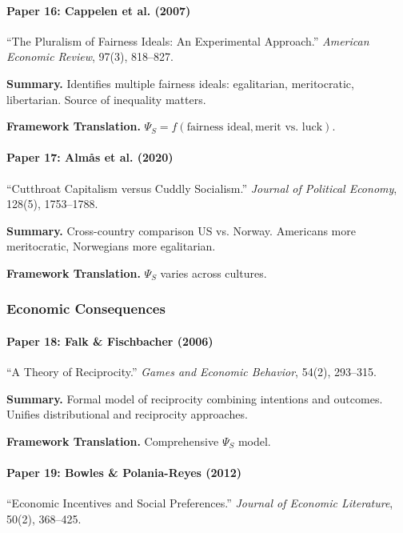 \paragraph{Paper 16: Cappelen et al. (2007)}

``The Pluralism of Fairness Ideals: An Experimental Approach.''
\textit{American Economic Review}, 97(3), 818--827.

\textbf{Summary.}
Identifies multiple fairness ideals: egalitarian, meritocratic, libertarian.
Source of inequality matters.

\textbf{Framework Translation.}
$\Psi_S = f(\text{fairness ideal}, \text{merit vs. luck})$.

\paragraph{Paper 17: Almås et al. (2020)}

``Cutthroat Capitalism versus Cuddly Socialism.''
\textit{Journal of Political Economy}, 128(5), 1753--1788.

\textbf{Summary.}
Cross-country comparison US vs. Norway. Americans more meritocratic, 
Norwegians more egalitarian.

\textbf{Framework Translation.}
$\Psi_S$ varies across cultures.

\subsubsection{Economic Consequences}

\paragraph{Paper 18: Falk \& Fischbacher (2006)}

``A Theory of Reciprocity.''
\textit{Games and Economic Behavior}, 54(2), 293--315.

\textbf{Summary.}
Formal model of reciprocity combining intentions and outcomes.
Unifies distributional and reciprocity approaches.

\textbf{Framework Translation.}
Comprehensive $\Psi_S$ model.

\paragraph{Paper 19: Bowles \& Polania-Reyes (2012)}

``Economic Incentives and Social Preferences.''
\textit{Journal of Economic Literature}, 50(2), 368--425.


